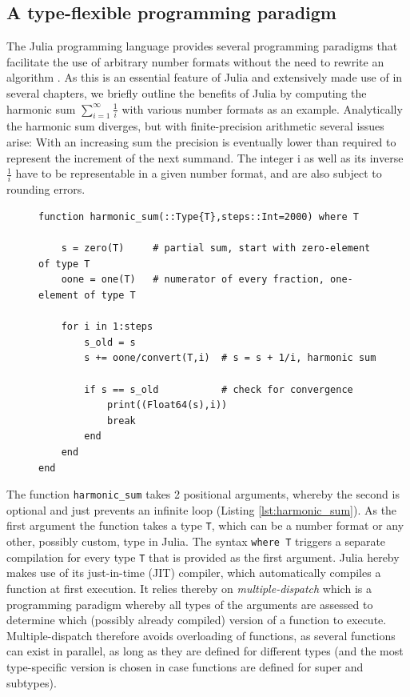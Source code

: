 \subsection{A type-flexible programming paradigm}

The Julia programming language provides several programming paradigms that facilitate the use of arbitrary number formats
without the need to rewrite an algorithm \citep{Bezanson2017}. As this is an essential feature of Julia and extensively made 
use of in several chapters, we briefly outline the benefits of Julia by computing the harmonic sum
$\sum_{i=1}^\infty \tfrac{1}{i}$ with various number formats as an example. Analytically the harmonic sum diverges, but with
finite-precision arithmetic several issues arise: With an increasing sum the precision is eventually lower than required to
represent the increment of the next summand. The integer i as well as its inverse $\tfrac{1}{i}$ have to be representable
in a given number format, and are also subject to rounding errors.

\begin{figure}[tbhp]
\begin{lstlisting}[language=JuliaLocal, label=lst:harmonic_sum, caption={\textbf{A type-flexible function calculating the harmonic sum in Julia.}
The number format is passed on as type in the first argument. The syntax \texttt{where T} triggers a separate compilation for every number
format. The function \texttt{harmonic\_sum} is type-stable as all types inside the function are declared and therefore unambiguous to the
compiler.}]
function harmonic_sum(::Type{T},steps::Int=2000) where T

    s = zero(T)     # partial sum, start with zero-element of type T
    oone = one(T)   # numerator of every fraction, one-element of type T

    for i in 1:steps
        s_old = s
        s += oone/convert(T,i)  # s = s + 1/i, harmonic sum

        if s == s_old           # check for convergence
            print((Float64(s),i))
            break
        end
    end
end
\end{lstlisting}
\end{figure}

The function \texttt{harmonic\_sum} takes 2 positional arguments, whereby the second is optional and just prevents an
infinite loop (Listing \ref{lst:harmonic_sum}). As the first argument the function takes a type \texttt{T}, which can be a
number format or any other, possibly custom, type in Julia. The syntax \texttt{where T} triggers a separate compilation
for every type \texttt{T} that is provided as the first argument. Julia hereby makes use of its just-in-time (JIT) compiler,
which automatically compiles a function at first execution. It relies thereby on \emph{multiple-dispatch} which is a
programming paradigm whereby all types of the arguments are assessed to determine which (possibly already compiled)
version of a function to execute. Multiple-dispatch therefore avoids overloading of functions, as several functions
can exist in parallel, as long as they are defined for different types (and the most type-specific version is chosen in
case functions are defined for super and subtypes).

